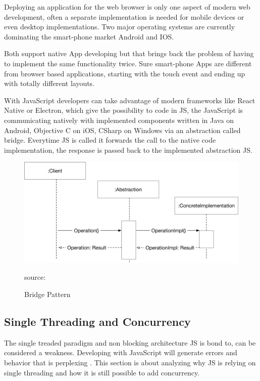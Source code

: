 Deploying an application for the web browser is only one aspect of modern web development, often a separate implementation is needed for mobile devices or even desktop implementations. Two major operating systems are currently dominating the smart-phone market Android and IOS. 

Both support native App developing but that brings back the problem of having to implement the same functionality twice. Sure smart-phone Apps are different from browser based applications, starting with the touch event and ending up with totally different layouts. 

With JavaScript developers can take advantage of modern frameworks like React Native or Electron, which give the possibility to code in \gls{JS}, the JavaScript is communicating natively with implemented components written in Java on Android, Objective C on iOS, CSharp on Windows via an abstraction called bridge. Everytime \gls{JS} is called it forwards the call to the native code implementation, the response is passed back to the implemented abstraction \gls{JS}.

\begin{figure}[H]
	\centering
	\includegraphics[width=\linewidth]{bilder/grundlagen/BridgePattern.png}
	\caption{Bridge Pattern} source:\cite{GOLL}
	\label{fig:BP}
\end{figure}


\subsection{Single Threading and Concurrency}
The single treaded paradigm and non blocking architecture \gls{JS} is bond to, can be considered a weakness. Developing with JavaScript will generate errors and behavior that is perplexing . This section is about analyzing why \gls{JS} is relying on single threading and how it is still possible to add concurrency.

